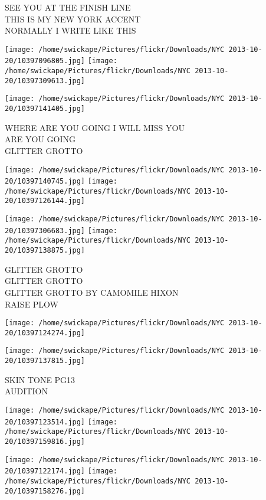 \documentclass[10pt,letterpaper]{article}
\begin{document}
SEE YOU AT THE FINISH LINE\\
THIS IS MY NEW YORK ACCENT\\
NORMALLY I WRITE LIKE THIS\\
\pagebreak

\texttt{[image: /home/swickape/Pictures/flickr/Downloads/NYC 2013-10-20/10397096805.jpg]}
\texttt{[image: /home/swickape/Pictures/flickr/Downloads/NYC 2013-10-20/10397309613.jpg]}

\vspace{0.25in}
\texttt{[image: /home/swickape/Pictures/flickr/Downloads/NYC 2013-10-20/10397141405.jpg]}

WHERE ARE YOU GOING I WILL MISS YOU\\
ARE YOU GOING\\
GLITTER GROTTO\\
\pagebreak

\texttt{[image: /home/swickape/Pictures/flickr/Downloads/NYC 2013-10-20/10397140745.jpg]}
\texttt{[image: /home/swickape/Pictures/flickr/Downloads/NYC 2013-10-20/10397126144.jpg]}

\texttt{[image: /home/swickape/Pictures/flickr/Downloads/NYC 2013-10-20/10397306683.jpg]}
\texttt{[image: /home/swickape/Pictures/flickr/Downloads/NYC 2013-10-20/10397138875.jpg]}

GLITTER GROTTO\\
GLITTER GROTTO\\
GLITTER GROTTO BY CAMOMILE HIXON\\
RAISE PLOW\\
\pagebreak

\texttt{[image: /home/swickape/Pictures/flickr/Downloads/NYC 2013-10-20/10397124274.jpg]}

\vspace{0.25in}
\texttt{[image: /home/swickape/Pictures/flickr/Downloads/NYC 2013-10-20/10397137815.jpg]}

SKIN TONE PG13\\
AUDITION\\
\pagebreak

\texttt{[image: /home/swickape/Pictures/flickr/Downloads/NYC 2013-10-20/10397123514.jpg]}
\texttt{[image: /home/swickape/Pictures/flickr/Downloads/NYC 2013-10-20/10397159816.jpg]}

\texttt{[image: /home/swickape/Pictures/flickr/Downloads/NYC 2013-10-20/10397122174.jpg]}
\texttt{[image: /home/swickape/Pictures/flickr/Downloads/NYC 2013-10-20/10397158276.jpg]}
\end{document}

